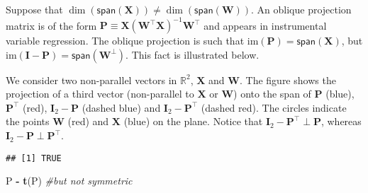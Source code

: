 \documentclass[]{book}
\newenvironment{Shaded}{\begin{snugshade}}{\end{snugshade}}
\newcommand{\KeywordTok}[1]{\textcolor[rgb]{0.13,0.29,0.53}{\textbf{#1}}}
\newcommand{\DecValTok}[1]{\textcolor[rgb]{0.00,0.00,0.81}{#1}}
\newcommand{\FloatTok}[1]{\textcolor[rgb]{0.00,0.00,0.81}{#1}}
\newcommand{\StringTok}[1]{\textcolor[rgb]{0.31,0.60,0.02}{#1}}
\newcommand{\CommentTok}[1]{\textcolor[rgb]{0.56,0.35,0.01}{\textit{#1}}}
\newcommand{\OperatorTok}[1]{\textcolor[rgb]{0.81,0.36,0.00}{\textbf{#1}}}
\newcommand{\NormalTok}[1]{#1}
\begin{document}
Suppose that
\(\dim(\mathsf{span}(\mathbf{X})) \neq \dim(\mathsf{span}(\mathbf{W}))\).
An oblique projection matrix is of the form
\(\mathbf{P}\equiv\mathbf{X}(\mathbf{W}^\top\mathbf{X})^{-1}\mathbf{W}^\top\)
and appears in instrumental variable regression. The oblique projection
is such that \(\mathrm{im}(\mathbf{P})=\mathsf{span}(\mathbf{X})\), but
\(\mathrm{im}(\mathbf{I}-\mathbf{P})=\mathsf{span}(\mathbf{W}^\perp)\).
This fact is illustrated below.

We consider two non-parallel vectors in \(\mathbb{R}^2\), \(\mathbf{X}\)
and \(\mathbf{W}\). The figure shows the projection of a third vector
(non-parallel to \(\mathbf{X}\) or \(\mathbf{W}\)) onto the span of
\(\mathbf{P}\) (blue), \(\mathbf{P}^\top\) (red),
\(\mathbf{I}_2-\mathbf{P}\) (dashed blue) and
\(\mathbf{I}_2-\mathbf{P}^\top\) (dashed red). The circles indicate the
points \(\mathbf{W}\) (red) and \(\mathbf{X}\) (blue) on the plane.
Notice that \(\mathbf{I}_2-\mathbf{P}^\top \perp \mathbf{P}\), whereas
\(\mathbf{I}_2-\mathbf{P} \perp \mathbf{P}^\top\).

\begin{Shaded}
\end{Shaded}

\begin{verbatim}
## [1] TRUE
\end{verbatim}

\begin{Shaded}
\begin{Highlighting}[]
\NormalTok{P }\OperatorTok{-}\StringTok{ }\KeywordTok{t}\NormalTok{(P) }\CommentTok{#but not symmetric}
\end{Highlighting}
\end{Shaded}
\end{document}
